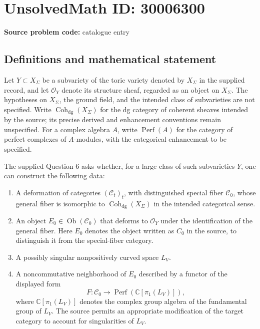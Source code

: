 \documentclass[11pt]{article}
\begin{document}
\section*{UnsolvedMath ID: 30006300}
\textbf{Source problem code:} catalogue entry
\subsection{Definitions and mathematical statement}
Let \(Y\subset X_\Sigma\) be a subvariety of the toric variety denoted by \(X_\Sigma\) in the supplied record, and let \(\mathcal O_Y\) denote its structure sheaf, regarded as an object on \(X_\Sigma\). The hypotheses on \(X_\Sigma\), the ground field, and the intended class of subvarieties are not specified. Write \(\operatorname{Coh}_{\mathrm{dg}}(X_\Sigma)\) for the dg category of coherent sheaves intended by the source; its precise derived and enhancement conventions remain unspecified. For a complex algebra \(A\), write \(\operatorname{Perf}(A)\) for the category of perfect complexes of \(A\)-modules, with the categorical enhancement to be specified.

The supplied Question 6 asks whether, for a large class of such subvarieties \(Y\), one can construct the following data:
\begin{enumerate}
\item A deformation of categories \((\mathcal C_t)_t\), with distinguished special fiber \(\mathcal C_0\), whose general fiber is isomorphic to \(\operatorname{Coh}_{\mathrm{dg}}(X_\Sigma)\) in the intended categorical sense.
\item An object \(E_0\in\operatorname{Ob}(\mathcal C_0)\) that deforms to \(\mathcal O_Y\) under the identification of the general fiber. Here \(E_0\) denotes the object written as \(C_0\) in the source, to distinguish it from the special-fiber category.
\item A possibly singular nonpositively curved space \(L_V\).
\item A noncommutative neighborhood of \(E_0\) described by a functor of the displayed form
\[
F\colon\mathcal C_0\longrightarrow
\operatorname{Perf}\!\left(\mathbb C[\pi_1(L_V)]\right),
\]
where \(\mathbb C[\pi_1(L_V)]\) denotes the complex group algebra of the fundamental group of \(L_V\). The source permits an appropriate modification of the target category to account for singularities of \(L_V\).
\end{enumerate}
\end{document}
